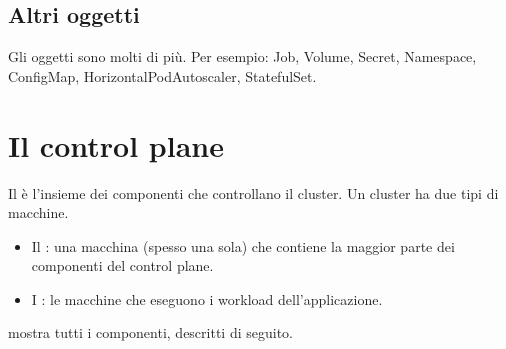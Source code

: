 \subsection{Altri oggetti}

Gli oggetti sono molti di più. Per esempio: Job, Volume, Secret, Namespace, ConfigMap, HorizontalPodAutoscaler,
StatefulSet.

\section{Il control plane}
\label{sec:k8s-control-plane}

Il  è l'insieme dei componenti che controllano il cluster. Un cluster ha due tipi di macchine.
\begin{itemize}
  \item Il : una macchina (spesso una sola) che contiene la maggior parte dei componenti del
    control plane.
  \item I : le macchine che eseguono i workload dell'applicazione.
\end{itemize}
 mostra tutti i componenti, descritti di seguito.

